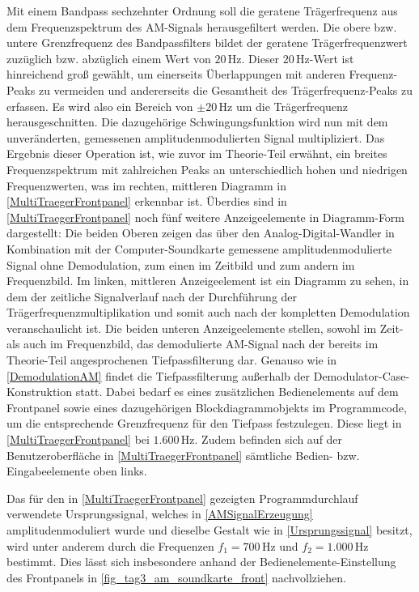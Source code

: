 \documentclass[
a4paper,
12pt,
pagesize,
ngerman
]{scrartcl}
\begin{document}
	\noindent Mit einem Bandpass sechzehnter Ordnung soll die geratene Trägerfrequenz aus dem Frequenzspektrum des AM-Signals herausgefiltert werden. 
	Die obere bzw. untere Grenzfrequenz des Bandpassfilters bildet der geratene Trägerfrequenzwert zuzüglich bzw. abzüglich einem Wert von $20\,$Hz. 
	Dieser $20\,$Hz-Wert ist hinreichend groß gewählt, um einerseits Überlappungen mit anderen Frequenz-Peaks zu vermeiden und andererseits die Gesamtheit des Trägerfrequenz-Peaks zu erfassen. 
	Es wird also ein Bereich von $\pm 20\,$Hz um die Trägerfrequenz \glqq herausgeschnitten\glqq . 
	Die dazugehörige Schwingungsfunktion wird nun mit dem unveränderten, gemessenen amplitudenmodulierten Signal multipliziert. 
	Das Ergebnis dieser Operation ist, wie zuvor im Theorie-Teil erwähnt, ein breites Frequenzspektrum mit zahlreichen Peaks an unterschiedlich hohen und niedrigen Frequenzwerten, was im rechten, mittleren Diagramm in \cref{MultiTraegerFrontpanel} erkennbar ist. 
	Überdies sind in \cref{MultiTraegerFrontpanel} noch fünf weitere Anzeigeelemente in Diagramm-Form dargestellt: Die beiden Oberen zeigen das über den Analog-Digital-Wandler in Kombination mit der Computer-Soundkarte gemessene amplitudenmodulierte Signal ohne Demodulation, zum einen im Zeitbild und zum andern im Frequenzbild. 
	Im linken, mittleren Anzeigeelement ist ein Diagramm zu sehen, in dem der zeitliche Signalverlauf nach der Durchführung der Trägerfrequenzmultiplikation und somit auch nach der kompletten Demodulation veranschaulicht ist. 
	Die beiden unteren Anzeigeelemente stellen, sowohl im Zeit- als auch im Frequenzbild, das demodulierte AM-Signal nach der bereits im Theorie-Teil angesprochenen Tiefpassfilterung dar. 
	Genauso wie in \cref{DemodulationAM} findet die Tiefpassfilterung außerhalb der Demodulator-Case-Konstruktion statt. 
	Dabei bedarf es eines zusätzlichen Bedienelements auf dem Frontpanel sowie eines dazugehörigen Blockdiagrammobjekts im Programmcode, um die entsprechende Grenzfrequenz für den Tiefpass festzulegen. 
	Diese liegt in \cref{MultiTraegerFrontpanel} bei $1.600\,$Hz. 
	Zudem befinden sich auf der Benutzeroberfläche in \cref{MultiTraegerFrontpanel} sämtliche Bedien- bzw. Eingabeelemente oben links.
	
	Das für den in \cref{MultiTraegerFrontpanel} gezeigten Programmdurchlauf verwendete Ursprungssignal, welches in \cref{AMSignalErzeugung} amplitudenmoduliert wurde und dieselbe Gestalt wie in \cref{Ursprungssignal} besitzt, wird unter anderem durch die Frequenzen $f_1 = 700\,$Hz und $f_2 = 1.000\,$Hz bestimmt. 
	Dies lässt sich insbesondere anhand der Bedienelemente-Einstellung des Frontpanels in \cref{fig_tag3_am_soundkarte_front} nachvollziehen. 
				
\end{document}
